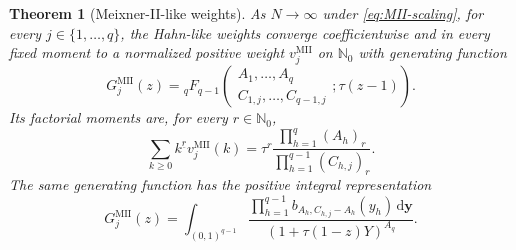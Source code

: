 \documentclass[10pt,a4paper]{amsart}
\newtheorem{theorem}{Theorem}
\newcommand{\Nzero}{\mathbb N_0}
\newcommand{\dd}{\,\mathrm d}
\newcommand{\fall}[2]{#1^{\underline{#2}}}
\newcommand{\pFq}[5]{{}_{#1}F_{#2}\!\left(\begin{matrix}#3\\#4\end{matrix};#5\right)}
\begin{document}
\begin{theorem}[Meixner-II-like weights]
\label{thm:MII-rows}
As \(N\to\infty\) under \eqref{eq:MII-scaling}, for every
\(j\in\{1,\ldots,q\}\), the Hahn-like weights converge coefficientwise
and in every fixed moment to a normalized positive weight
\(v_j^{\mathrm{MII}}\) on \(\Nzero\) with generating function
\begin{equation}
 G_j^{\mathrm{MII}}(z)
 =\pFq{q}{q-1}{A_1,\ldots,A_q}
 {C_{1,j},\ldots,C_{q-1,j}}{\tau(z-1)}.
 \label{eq:MII-pgf}
\end{equation}
Its factorial moments are, for every \(r\in\Nzero\),
\begin{equation}
 \sum_{k\ge0}\fall{k}{r}v_j^{\mathrm{MII}}(k)
 =\tau^r\frac{\prod_{h=1}^q(A_h)_r}
 {\prod_{h=1}^{q-1}(C_{h,j})_r}.
 \label{eq:MII-factorial-moments}
\end{equation}
The same generating function has the positive integral representation
\begin{equation}
 G_j^{\mathrm{MII}}(z)
 =\int_{(0,1)^{q-1}}
 \frac{\prod_{h=1}^{q-1}b_{A_h,C_{h,j}-A_h}(y_h)
       \dd\boldsymbol y}
 {(1+\tau(1-z)Y)^{A_q}}.
 \label{eq:MII-positive-integral}
\end{equation}
\end{theorem}
\end{document}

